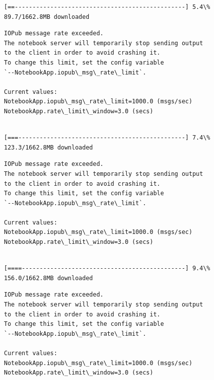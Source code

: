 \documentclass[11pt]{article}
\begin{document}
    \begin{Verbatim}[commandchars=\\\{\}]
[==------------------------------------------------] 5.4\% 89.7/1662.8MB downloaded
    \end{Verbatim}

    \begin{Verbatim}[commandchars=\\\{\}]
IOPub message rate exceeded.
The notebook server will temporarily stop sending output
to the client in order to avoid crashing it.
To change this limit, set the config variable
`--NotebookApp.iopub\_msg\_rate\_limit`.

Current values:
NotebookApp.iopub\_msg\_rate\_limit=1000.0 (msgs/sec)
NotebookApp.rate\_limit\_window=3.0 (secs)


    \end{Verbatim}

    \begin{Verbatim}[commandchars=\\\{\}]
[===-----------------------------------------------] 7.4\% 123.3/1662.8MB downloaded
    \end{Verbatim}

    \begin{Verbatim}[commandchars=\\\{\}]
IOPub message rate exceeded.
The notebook server will temporarily stop sending output
to the client in order to avoid crashing it.
To change this limit, set the config variable
`--NotebookApp.iopub\_msg\_rate\_limit`.

Current values:
NotebookApp.iopub\_msg\_rate\_limit=1000.0 (msgs/sec)
NotebookApp.rate\_limit\_window=3.0 (secs)


    \end{Verbatim}

    \begin{Verbatim}[commandchars=\\\{\}]
[====----------------------------------------------] 9.4\% 156.0/1662.8MB downloaded
    \end{Verbatim}

    \begin{Verbatim}[commandchars=\\\{\}]
IOPub message rate exceeded.
The notebook server will temporarily stop sending output
to the client in order to avoid crashing it.
To change this limit, set the config variable
`--NotebookApp.iopub\_msg\_rate\_limit`.

Current values:
NotebookApp.iopub\_msg\_rate\_limit=1000.0 (msgs/sec)
NotebookApp.rate\_limit\_window=3.0 (secs)


    \end{Verbatim}
\end{document}
